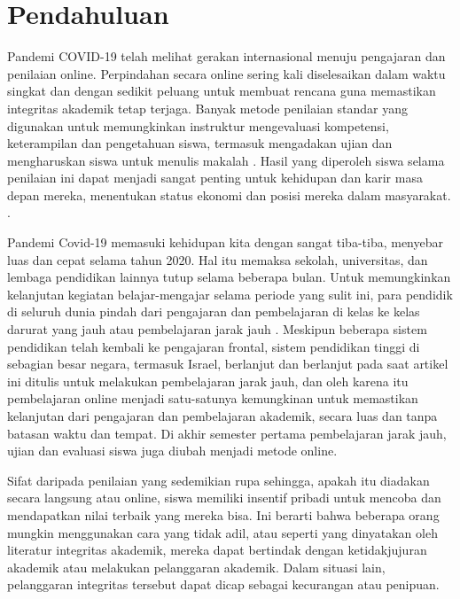 \section{Pendahuluan}
\label{sec:pendahuluan}


Pandemi COVID-19 telah melihat gerakan internasional menuju pengajaran dan penilaian online. Perpindahan secara online sering kali diselesaikan dalam waktu singkat dan dengan sedikit peluang untuk membuat rencana guna memastikan integritas akademik tetap terjaga. Banyak metode penilaian standar yang digunakan untuk memungkinkan instruktur mengevaluasi kompetensi, keterampilan dan pengetahuan siswa, termasuk mengadakan ujian dan mengharuskan siswa untuk menulis makalah \citet{stiggins2017perfect} \citet{wiggins2011true}. Hasil yang diperoleh siswa selama penilaian ini dapat menjadi sangat penting untuk kehidupan dan karir masa depan mereka, menentukan status ekonomi dan posisi mereka dalam masyarakat. \citet{fontaine2020exam}.

Pandemi Covid-19 memasuki kehidupan kita dengan sangat tiba-tiba, menyebar luas dan cepat selama tahun 2020. Hal itu memaksa sekolah, universitas, dan lembaga pendidikan lainnya tutup selama beberapa bulan. Untuk memungkinkan kelanjutan kegiatan belajar-mengajar selama periode yang sulit ini, para pendidik di seluruh dunia pindah dari pengajaran dan pembelajaran di kelas ke kelas darurat yang jauh atau pembelajaran jarak jauh \citet{rebecca2020}. Meskipun beberapa sistem pendidikan telah kembali ke pengajaran frontal, sistem pendidikan tinggi di sebagian besar negara, termasuk Israel, berlanjut dan berlanjut pada saat artikel ini ditulis untuk melakukan pembelajaran jarak jauh, dan oleh karena itu pembelajaran online menjadi satu-satunya kemungkinan untuk memastikan kelanjutan dari pengajaran dan pembelajaran akademik, secara luas dan tanpa batasan waktu dan tempat. Di akhir semester pertama pembelajaran jarak jauh, ujian dan evaluasi siswa juga diubah menjadi metode online.

Sifat daripada penilaian yang sedemikian rupa sehingga, apakah itu diadakan secara langsung atau online, siswa memiliki insentif pribadi untuk mencoba dan mendapatkan nilai terbaik yang mereka bisa. Ini berarti bahwa beberapa orang mungkin menggunakan cara yang tidak adil, atau seperti yang dinyatakan oleh literatur integritas akademik, mereka dapat bertindak dengan ketidakjujuran akademik atau melakukan pelanggaran akademik. Dalam situasi lain, pelanggaran integritas tersebut dapat dicap sebagai kecurangan atau penipuan.

